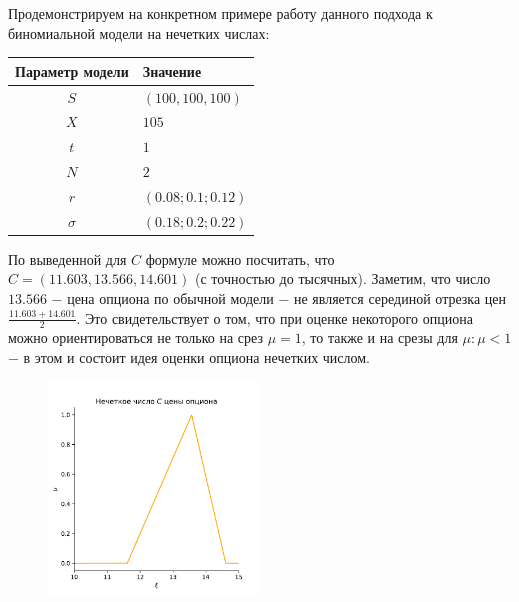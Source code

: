 \documentclass[a4paper,12pt]{extarticle} %
\begin{document}
	Продемонстрируем на конкретном примере работу данного подхода к биномиальной модели на нечетких числах:
	
	\begin{center}
		\begin{tabular}{|c|l|}
			\hline
			\textbf{Параметр модели} & \textbf{Значение} \\
			\hline
			$S$ & $(100, 100, 100)$ \\
			$X$ & $105$ \\
			$t$ & $1$ \\
			$N$ & $2$ \\
			$r$ & $(0.08; 0.1; 0.12)$ \\
			$\sigma$ & $(0.18; 0.2; 0.22)$ \\
			\hline
		\end{tabular}
	\end{center}
	
	По выведенной для $C$ формуле можно посчитать, что $C=(11.603,13.566,14.601)$ (с точностью до тысячных). Заметим, что число $13.566$ $-$ цена опциона по обычной модели $-$ не является серединой отрезка цен $\frac{11.603+14.601}{2}$. Это свидетельствует о том, что при оценке некоторого опциона можно ориентироваться не только на срез $\mu=1$, то также и на срезы для $\mu: \mu < 1$ $-$ в этом и состоит идея оценки опциона нечетких числом. 
	
	\begin{figure}[H]
		\centering
		\includegraphics[width=0.5\textwidth]{_images/Биномиальная модель на нечетких числах_3.pdf}
	\end{figure}
	
\end{document}
